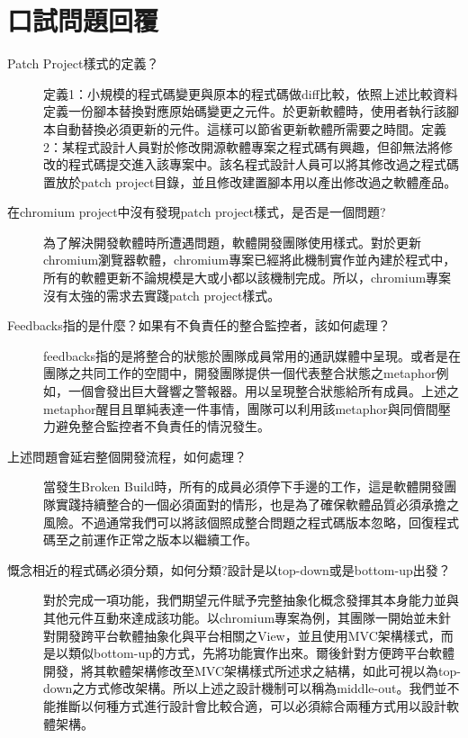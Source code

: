 \documentclass[12pt]{article}
\begin{document}
\section{口試問題回覆}
\begin{description}
\item[Patch Project樣式的定義？] 定義1：小規模的程式碼變更與原本的程式碼做diff比較，依照上述比較資料定義一份腳本替換對應原始碼變更之元件。於更新軟體時，使用者執行該腳本自動替換必須更新的元件。這樣可以節省更新軟體所需要之時間。定義2：某程式設計人員對於修改開源軟體專案之程式碼有興趣，但卻無法將修改的程式碼提交進入該專案中。該名程式設計人員可以將其修改過之程式碼置放於patch project目錄，並且修改建置腳本用以產出修改過之軟體產品。
\item[在chromium project中沒有發現patch project樣式，是否是一個問題?] 
為了解決開發軟體時所遭遇問題，軟體開發團隊使用樣式。對於更新chromium瀏覽器軟體，chromium專案已經將此機制實作並內建於程式中，所有的軟體更新\hspace{3pt}\textemdash\hspace{3pt}不論規模是大或小\hspace{3pt}\textemdash\hspace{3pt}都以該機制完成。所以，chromium專案沒有太強的需求去實踐patch project樣式。
\item[Feedbacks指的是什麼？如果有不負責任的整合監控者，該如何處理？] feedbacks指的是將整合的狀態於團隊成員常用的通訊媒體中呈現。或者是在團隊之共同工作的空間中，開發團隊提供一個代表整合狀態之metaphor\hspace{3pt}\textemdash\hspace{3pt}例如，一個會發出巨大聲響之警報器。\hspace{3pt}\textemdash\hspace{3pt}用以呈現整合狀態給所有成員。上述之metaphor醒目且單純表達一件事情，團隊可以利用該metaphor與同儕間壓力避免整合監控者不負責任的情況發生。
\item[上述問題會延宕整個開發流程，如何處理？] 當發生Broken Build時，所有的成員必須停下手邊的工作，這是軟體開發團隊實踐持續整合的一個必須面對的情形，也是為了確保軟體品質必須承擔之風險。不過通常我們可以將該個照成整合問題之程式碼版本忽略，回復程式碼至之前運作正常之版本以繼續工作。
\item[慨念相近的程式碼必須分類，如何分類?設計是以top-down或是bottom-up出發？]
對於完成一項功能，我們期望元件\hspace{3pt}\textemdash\hspace{3pt}賦予完整抽象化概念\hspace{3pt}\textemdash\hspace{3pt}發揮其本身能力並與其他元件互動來達成該功能。以chromium專案為例，其團隊一開始並未針對開發跨平台軟體抽象化與平台相關之View，並且使用MVC架構樣式，而是以類似bottom-up的方式，先將功能實作出來。爾後針對方便跨平台軟體開發，將其軟體架構修改至MVC架構樣式所述求之結構，如此可視以為top-down之方式修改架構。所以上述之設計機制可以稱為middle-out。我們並不能推斷以何種方式進行設計會比較合適，可以必須綜合兩種方式用以設計軟體架構。

\end{description}
\end{document}
